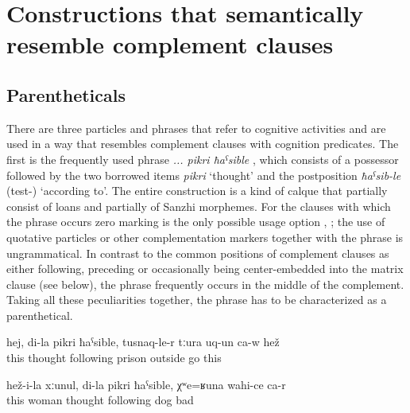 \section{Constructions that semantically resemble complement clauses}
\label{Constructions that semantically resemble complement clauses}


\subsection{Parentheticals}
\label{ssec:Parentheticals}

There are three particles and phrases that refer to cognitive activities and are used in a way that resembles complement clauses with cognition predicates. The first is the frequently used phrase \textit{... pikri ħaˁsible} , which consists of a possessor followed by the two borrowed items \textit{pikri} `thought' and the postposition \textit{ħaˁsib-le} (test-) `according to'. The entire construction is a kind of calque that partially consist of loans and partially of Sanzhi morphemes. For the clauses with which the phrase occurs zero marking is the only possible usage option , ; the use of quotative particles or other complementation markers together with the phrase is ungrammatical. In contrast to the common positions of complement clauses as either following, preceding or occasionally being center-embedded into the matrix clause (see  below), the phrase frequently occurs in the middle of the complement. Taking all these peculiarities together, the phrase has to be characterized as a parenthetical. 
%
\begin{exe}
	\ex	\label{ex:‎In my mind, he left prison}
	\gll	hej,	di-la	pikri	ħaˁsible,	tusnaq-le-r	tːura	uq-un	ca-w	hež\\
		this		thought following	prison	outside	go		this\\
	\glt	{}

	\ex	\label{ex:His wife is, in my mind bad like a dog@15}
	\gll	hež-i-la	xːunul,	di-la	pikri	ħaˁsible,	χʷe=ʁuna	wahi-ce	ca-r \\
		this	woman		thought	following	dog	bad	\\
	\glt	{}
\end{exe}

